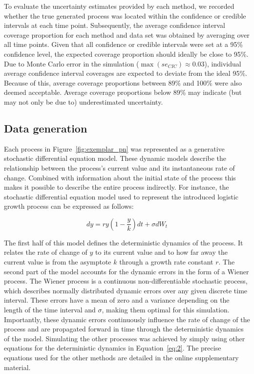 \documentclass[man, floatsintext]{apa7}
\begin{document}
To evaluate the uncertainty estimates provided by each method, we recorded
whether the true generated process was located within the confidence or
credible intervals at each time point. Subsequently, the average confidence
interval coverage proportion for each method and data set was obtained by
averaging over all time points. Given that all confidence or credible intervals
were set at a 95\% confidence level, the expected coverage proportion should
ideally be close to 95\%. Due to Monte Carlo error in the simulation
($\max(se_{CIC}) \approx 0.03$), individual average confidence interval
coverages are expected to deviate from the ideal 95\%. Because of this, average
coverage proportions between 89\% and 100\% were also deemed acceptable.
Average coverage proportions below 89\% may indicate (but may not only be due
to) underestimated uncertainty.

\subsection{Data generation}

Each process in Figure~\ref{fig:exemplar_pn} was represented as a generative
stochastic differential equation model. These dynamic models describe the
relationship between the process's current value and its instantaneous rate of
change. Combined with information about the initial state of the process this
makes it possible to describe the entire process indirectly. For instance, the
stochastic differential equation model used to represent the introduced
logistic growth process can be expressed as follows:

\begin{equation} \label{eq:2}
  dy = r y (1-\frac{y}{k})dt + \sigma dW_t
\end{equation}

\noindent The first half of this model defines the deterministic dynamics of
the process. It relates the rate of change of $y$ to its current value and to
how far away the current value is from the asymptote $k$ through a growth rate
constant $r$. The second part of the model accounts for the dynamic errors in
the form of a Wiener process. The Wiener process is a continuous
non-differentiable stochastic process, which describes normally distributed
dynamic errors over any given discrete time interval. These errors have a mean
of zero and a variance depending on the length of the time interval and
$\sigma$, making them optimal for this simulation. Importantly, these dynamic
errors continuously influence the rate of change of the process and are
propagated forward in time through the deterministic dynamics of the model.
Simulating the other processes was achieved by simply using other equations for
the deterministic dynamics in Equation~\ref{eq:2}. The precise equations used
for the other methods are detailed in the online supplementary material.
\end{document}
